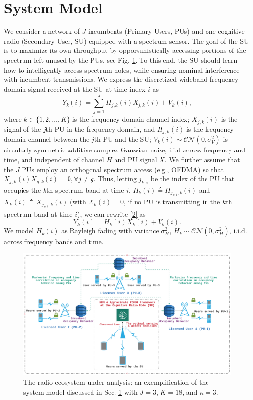 \documentclass[10pt,twocolumn]{IEEEtran}
\begin{document}
\section{System Model}\label{II}
We consider a network of $J$ incumbents (Primary Users, PUs) and one cognitive radio (Secondary User, SU) equipped with a spectrum sensor. The goal of the SU is to maximize its own throughput by opportunistically accessing portions of the spectrum left unused by the PUs, see Fig. \ref{fig:0}. To this end, the SU should learn how to intelligently access spectrum holes, while ensuring nominal interference with incumbent transmissions.
We express the discretized wideband frequency domain signal received at the SU
at time index $i$ as
\begin{equation}\label{2}
    Y_k(i) = \sum_{j=1}^{J} H_{j,k}(i)X_{j,k}(i) + V_k(i),
\end{equation}
where  $k {\in} \{1,2,\dots,K\}$
is the frequency domain channel index; $X_{j,k}(i)$ is the signal of the $j$th PU in the frequency domain, and $H_{j,k}(i)$ is the frequency domain channel between the $j$th PU and the SU; $V_k(i) {\sim} \mathcal{CN}(0,\sigma_V^2)$ is circularly symmetric additive complex Gaussian noise, i.i.d across frequency and time, and independent of channel $H$ and PU signal $X$. We further assume that the $J$ PUs employ an orthogonal spectrum access (e.g., OFDMA) so that $X_{j,k}(i)X_{g,k}(i){=}0, \forall j{\neq}g$. Thus, letting $j_{k,i}$ be the index of the PU that occupies the $k$th spectrum band at time $i$, $H_{k}(i){\triangleq}H_{j_{k,i},k}(i)$ and $X_{k}(i){\triangleq}X_{j_{k,i},k}(i)$ (with $X_{k}(i){=}0$, if no PU is transmitting in the $k$th spectrum band at time $i$), we can rewrite \eqref{2} as 
\begin{equation}\label{3}
    Y_k(i) = H_{k}(i)X_{k}(i) + V_k(i).
\end{equation}
We model $H_{k}(i)$ as Rayleigh fading with variance $\sigma_H^2$, $H_k {\sim} \mathcal{CN}(0,\sigma_H^2)$, i.i.d. across frequency bands and time.
\begin{figure} [t]
    \centering
    \includegraphics[width=1.0\linewidth]{System_Model_1.png}
    \caption{The radio ecosystem under analysis: an exemplification of the system model discussed in Sec. \ref{II} with $J{=}3$, $K{=}18$, and $\kappa{=}3$.}
    \label{fig:0}
    \vspace{-6mm}
\end{figure}
\end{document}
